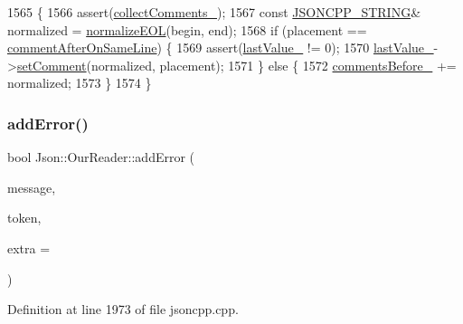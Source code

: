 \begin{DoxyCode}
1565                                                                               \{
1566   assert(\hyperlink{class_json_1_1_our_reader_a259f6ac988da2894bcafc670e42f73ad}{collectComments\_});
1567   \textcolor{keyword}{const} \hyperlink{json_8h_a1e723f95759de062585bc4a8fd3fa4be}{JSONCPP\_STRING}& normalized = \hyperlink{namespace_json_a63123f3dd63f340ac517a59f44ea7aa4}{normalizeEOL}(begin, end);
1568   \textcolor{keywordflow}{if} (placement == \hyperlink{namespace_json_a4fc417c23905b2ae9e2c47d197a45351a008a230a0586de54f30b76afe70fdcfa}{commentAfterOnSameLine}) \{
1569     assert(\hyperlink{class_json_1_1_our_reader_a9f994b6a2227c5d96e6ed6cbc74ed251}{lastValue\_} != 0);
1570     \hyperlink{class_json_1_1_our_reader_a9f994b6a2227c5d96e6ed6cbc74ed251}{lastValue\_}->\hyperlink{class_json_1_1_value_a29f3a30f7e5d3af6f38d57999bf5b480}{setComment}(normalized, placement);
1571   \} \textcolor{keywordflow}{else} \{
1572     \hyperlink{class_json_1_1_our_reader_a9c53e77e290eb9081298210a955fda6a}{commentsBefore\_} += normalized;
1573   \}
1574 \}
\end{DoxyCode}
\mbox{\label{class_json_1_1_our_reader_aa6a920311e6408ff3a45324d49da18a6}} 
\subsubsection{\texorpdfstring{add\+Error()}{addError()}}
{\footnotesize\ttfamily bool Json\+::\+Our\+Reader\+::add\+Error (\begin{DoxyParamCaption}\item[{const \hyperlink{json_8h_a1e723f95759de062585bc4a8fd3fa4be}{J\+S\+O\+N\+C\+P\+P\+\_\+\+S\+T\+R\+I\+NG} \&}]{message,  }\item[{\hyperlink{class_json_1_1_our_reader_1_1_token}{Token} \&}]{token,  }\item[{\hyperlink{class_json_1_1_our_reader_a1bdc7bbc52ba87cae6b19746f2ee0189}{Location}}]{extra = {} }\end{DoxyParamCaption})\hspace{0.3cm}{\ttfamily [private]}}



Definition at line 1973 of file jsoncpp.\+cpp.



